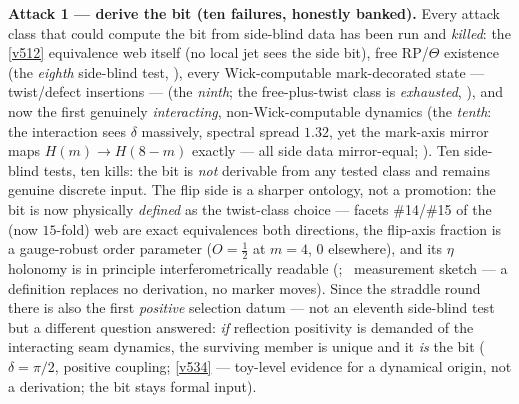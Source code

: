 \documentclass[11pt,a4paper]{article}
\begin{document}
\smallskip\noindent\textbf{Attack 1 --- derive the bit (ten failures, honestly banked).} Every
attack class that could compute the bit from side-blind data has been run and \emph{killed}: the
\vref{v512} equivalence web itself (no local jet sees the side bit), free RP/$\Theta$ existence
(the \emph{eighth} side-blind test, ), every Wick-computable
mark-decorated state --- twist/defect insertions --- (the \emph{ninth}; the free-plus-twist class
is \emph{exhausted}, ), and now the first genuinely
\emph{interacting}, non-Wick-computable dynamics (the \emph{tenth}: the interaction sees $\delta$
massively, spectral spread $1.32$, yet the mark-axis mirror maps $H(m)\to H(8-m)$ exactly ---
all side data mirror-equal; ). Ten side-blind tests,
ten kills: the bit is \emph{not} derivable from any tested class and remains genuine discrete
input. The flip side is a sharper ontology, not a promotion: the bit is now physically
\emph{defined} as the twist-class choice --- facets \#14/\#15 of the (now $15$-fold) web are
exact equivalences both directions, the flip-axis fraction is a gauge-robust order parameter
($O=\tfrac12$ at $m=4$, $0$ elsewhere), and its $\eta$ holonomy is in principle
interferometrically readable (; \mC\
measurement sketch --- a definition replaces no derivation, no marker moves). Since the straddle
round there is also the first \emph{positive} selection datum --- not an eleventh side-blind
test but a different question answered: \emph{if} reflection positivity is demanded of the
interacting seam dynamics, the surviving member is unique and it \emph{is} the bit
($\delta=\pi/2$, positive coupling; \vref{v534} --- toy-level evidence for a dynamical origin,
not a derivation; the bit stays formal input).
\end{document}
